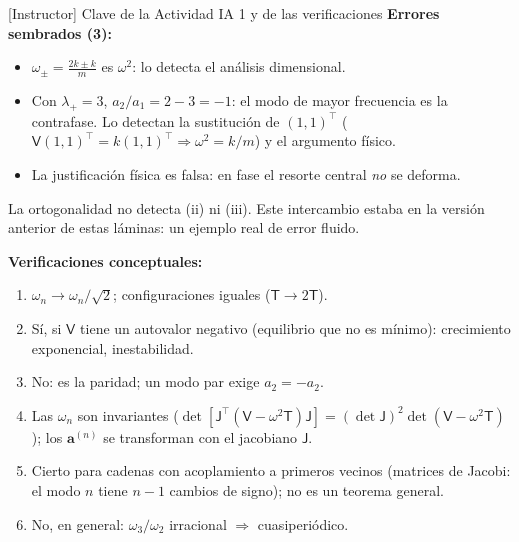\documentclass[spanish,10pt]{beamer}
\newcommand{\Tm}{\mathsf{T}}                 %
\newcommand{\Vm}{\mathsf{V}}                 %
\newcommand{\av}[1]{\mathbf{a}^{(#1)}}       %
\newcommand{\tr}{^{\top}}                    %
\begin{document}
\begin{frame}{[Instructor] Clave de la Actividad IA 1 y de las verificaciones}
\footnotesize
\textbf{Errores sembrados (3):}
\begin{itemize}
\item[(i)] $\omega_\pm=\frac{2k\pm k}{m}$ es $\omega^2$: lo detecta el análisis dimensional.
\item[(ii)] Con $\lambda_+=3$, $a_2/a_1=2-3=-1$: el modo de mayor frecuencia es la contrafase. Lo detectan la sustitución de $(1,1)\tr$ ($\Vm(1,1)\tr=k(1,1)\tr\Rightarrow\omega^2=k/m$) y el argumento físico.
\item[(iii)] La justificación física es falsa: en fase el resorte central \emph{no} se deforma.
\end{itemize}
La ortogonalidad no detecta (ii) ni (iii). Este intercambio estaba en la versión anterior de estas láminas: un ejemplo real de error fluido.

\textbf{Verificaciones conceptuales:}
\begin{enumerate}
\item $\omega_n\to\omega_n/\sqrt2$; configuraciones iguales ($\Tm\to2\Tm$).
\item Sí, si $\Vm$ tiene un autovalor negativo (equilibrio que no es mínimo): crecimiento exponencial, inestabilidad.
\item No: es la paridad; un modo par exige $a_2=-a_2$.
\item Las $\omega_n$ son invariantes ($\det[\mathsf J\tr(\Vm-\omega^2\Tm)\mathsf J]=(\det\mathsf J)^2\det(\Vm-\omega^2\Tm)$); los $\av n$ se transforman con el jacobiano $\mathsf J$.
\item Cierto para cadenas con acoplamiento a primeros vecinos (matrices de Jacobi: el modo $n$ tiene $n-1$ cambios de signo); no es un teorema general.
\item No, en general: $\omega_3/\omega_2$ irracional $\Rightarrow$ cuasiperiódico.
\end{enumerate}
\end{frame}
\end{document}
